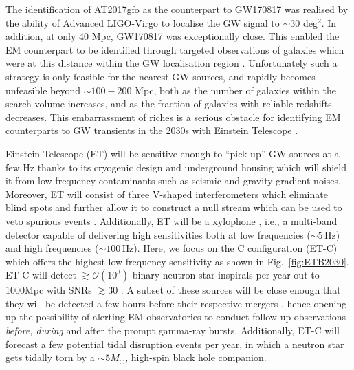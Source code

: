 \documentclass{aa}
\begin{document}
The identification of AT2017gfo as the counterpart to GW170817 was realised by the 
ability of Advanced LIGO-Virgo to localise the GW signal to $\sim$30 deg$^2$.
In addition, at only 40 Mpc, GW170817 was exceptionally close. This enabled the EM counterpart to be identified through targeted observations of galaxies which were at this distance within the GW localisation region \citep{Coul17}. Unfortunately such a strategy is only feasible for the nearest GW sources, and rapidly becomes unfeasible beyond $\sim100-200$ Mpc, both as the number of galaxies within the search volume increases, and as the fraction of galaxies with reliable redshifts decreases. 
This embarrassment of riches is a serious obstacle for identifying EM counterparts to GW transients in the 2030s with Einstein Telescope \citep{ET_doc}.

Einstein Telescope (ET) will be sensitive enough to ``pick up'' GW sources at a few Hz thanks to
its cryogenic design and underground housing which will shield it from low-frequency contaminants such as seismic and gravity-gradient noises. Moreover, ET will consist of three
 V-shaped interferometers which eliminate blind spots and further allow it to construct a null
 stream \citep{Sathyaprakash:2012jk} which can be used to veto spurious events \citep{Wen:2005ui}. 
 Additionally, ET will be a xylophone \citep{Hild:2009ns}, i.e., a multi-band detector capable of delivering high sensitivities both at low frequencies ($\sim 5\,$Hz) and high frequencies ($\sim 100\,$Hz). 
 Here, we focus on the C configuration (ET-C) which offers the highest low-frequency sensitivity as shown in Fig.~\ref{fig:ETB2030}.
 ET-C will detect $\gtrsim\mathcal{O}(10^3)$ binary neutron star inspirals per year out to 1000Mpc with SNRs $\gtrsim 30 $ \citep{Akcay18}. A subset of these sources will be close enough that they will be detected a few hours
before their respective mergers \citep{Akcay18}, hence opening up the possibility of alerting EM
observatories to conduct follow-up observations \emph{before, during} and after the prompt gamma-ray bursts. Additionally, ET-C will forecast a few potential tidal disruption events per year, in which
a neutron star gets tidally torn by a $\sim 5 M_\odot$, high-spin black hole companion.

\end{document}
